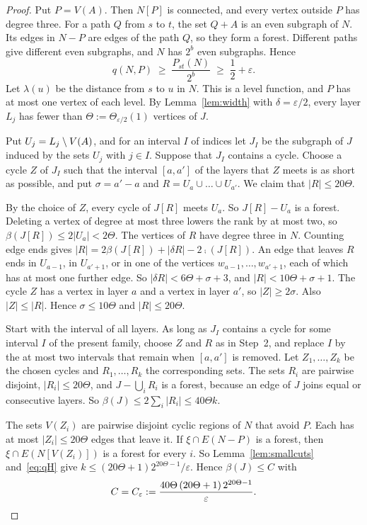 \begin{proof}
 Put $P=V(A)$. Then $N[P]$ is connected, and every vertex
outside $P$ has degree three. For a path $Q$ from $s$ to $t$, the set $Q+A$ is an even subgraph of
$N$. Its edges in $N-P$ are edges of the path $Q$, so they form a forest. Different paths give
different even subgraphs, and $N$ has $2^{b}$ even subgraphs. Hence
\begin{equation}\label{eq:qH}
  q(N,P)\;\ge\;\frac{P_{st}(N)}{2^{b}}\;\ge\;\frac12+\varepsilon .
\end{equation}
Let $\lambda(u)$ be the distance from $s$ to $u$ in $N$. This is a level function, and $P$ has at
most one vertex of each level. By Lemma~\ref{lem:width} with $\delta=\varepsilon/2$, every layer
$L_j$ has fewer than $\Theta:=\Theta_{\varepsilon/2}(1)$ vertices of $J$.

 Put $U_j=L_j\setminus V(A)$, and for an interval $I$ of indices let $J_I$ be
the subgraph of $J$ induced by the sets $U_j$ with $j\in I$. Suppose that $J_I$ contains a cycle.
Choose a cycle $Z$ of $J_I$ such that the interval $[a,a']$ of the layers that $Z$ meets is as
short as possible, and put $\sigma=a'-a$ and $R=U_a\cup\dots\cup U_{a'}$. We claim that
$|R|\le20\Theta$.

By the choice of $Z$, every cycle of $J[R]$ meets $U_a$. So $J[R]-U_a$ is a forest. Deleting a
vertex of degree at most three lowers the rank by at most two, so $\beta(J[R])\le2|U_a|<2\Theta$.
The vertices of $R$ have degree three in $N$. Counting edge ends gives
$|R|=2\beta(J[R])+|\delta R|-2\comp(J[R])$. An edge that leaves $R$ ends in $U_{a-1}$, in
$U_{a'+1}$, or in one of the vertices $w_{a-1},\dots,w_{a'+1}$, each of which has at most one
further edge. So $|\delta R|<6\Theta+\sigma+3$, and $|R|<10\Theta+\sigma+1$. The cycle $Z$ has a vertex in
layer $a$ and a vertex in layer $a'$, so $|Z|\ge2\sigma$. Also $|Z|\le|R|$. Hence
$\sigma\le10\Theta$ and $|R|\le20\Theta$.

 Start with the interval of all layers. As long as $J_I$ contains a
cycle for some interval $I$ of the present family, choose $Z$ and $R$ as in Step~2, and replace $I$
by the at most two intervals that remain when $[a,a']$ is removed. Let $Z_1,\dots,Z_k$ be the
chosen cycles and $R_1,\dots,R_k$ the corresponding sets. The sets $R_i$ are pairwise disjoint,
$|R_i|\le20\Theta$, and $J-\bigcup_iR_i$ is a forest, because an edge of $J$ joins equal or
consecutive layers. So $\beta(J)\le2\sum_i|R_i|\le40\Theta k$.

The sets $V(Z_i)$ are pairwise disjoint cyclic regions of $N$ that avoid $P$. Each has at most
$|Z_i|\le20\Theta$ edges that leave it. If $\xi\cap E(N-P)$ is a forest, then
$\xi\cap E(N[V(Z_i)])$ is a forest for every $i$. So Lemma~\ref{lem:smallcuts} and~\eqref{eq:qH}
give $k\le(20\Theta+1)2^{20\Theta-1}/\varepsilon$. Hence $\beta(J)\le C$ with
\[
  C=C_\varepsilon:=\frac{40\Theta\,(20\Theta+1)\,2^{20\Theta-1}}{\varepsilon}.\qedhere
\]
\end{proof}

